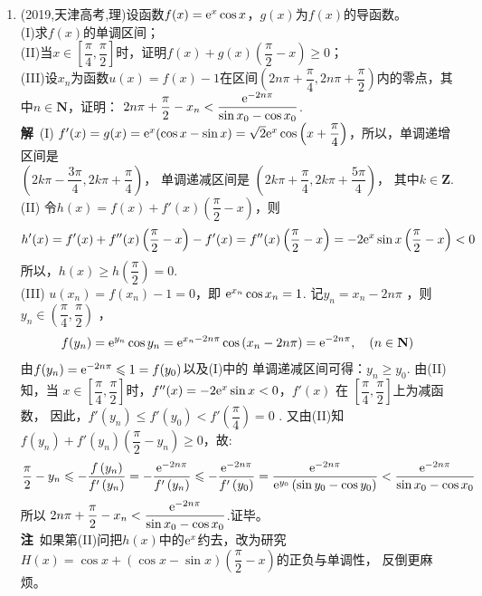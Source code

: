 \begin{enumerate}[label={【\textbf{例\thechapter.\arabic*}】},
 leftmargin=\inteval{\myenumleftmargin}pt,
 itemsep=\inteval{\myenumitempsep}pt,
 itemindent=\inteval{\myenumitemindent}pt]
\item (2019,天津高考,理)设函数$ f(x)=\mathrm{e}^x\cos x $，$ g(x) $为$ f(x) $的导函数。\\
(I)求$ f(x) $的单调区间；\\
(II)当$ x\in \left[\dfrac{\pi}{4},\dfrac{\pi}{2}\right] $时，证明$ f(x)+g(x)\left(\dfrac{\pi}{2}-x\right)\geq 0 $；\\
(III)设$ x_n $为函数$ u(x)=f(x)-1 $在区间$ \left(2n\pi+\dfrac{\pi}{4},2n\pi+
\dfrac{\pi}{2}\right) $内的零点，其中$ n\in \textbf{N} $，证明：
$ 2n\pi+\dfrac{\pi}{2}-x_n<\dfrac{\mathrm{e}^{-2n\pi}}{\sin x_0-\cos x_0} $.\\
\textbf{解}\ (I) $ f'(x)=g(x)=\mathrm{e}^x(\cos x-\sin x)=\sqrt{2}\mathrm{e}^x\cos\left(
x+\dfrac{\pi}{4}\right) $，所以，单调递增区间是 \\
$ \left(2k\pi-\dfrac{3\pi}{4},2k\pi+\dfrac{\pi}{4}\right) $，
单调递减区间是
$ \left(2k\pi+\dfrac{\pi}{4},2k\pi+\dfrac{5\pi}{4}\right) $，
其中$ k\in \textbf{Z} $. \\
(II) 令$ h(x)=f(x)+f'(x)\left(\dfrac{\pi}{2}-x\right) $，则
\begin{gather*}
    h'(x)= f'(x)+f''(x)\left(\dfrac{\pi}{2}-x\right)-f'(x)=
    f''(x)\left(\dfrac{\pi}{2}-x\right)
    =-2\mathrm{e}^x\sin x \left(\dfrac{\pi}{2}-x\right)<0
\end{gather*}
所以，$ h(x)\geq h\left(\dfrac{\pi}{2}\right)=0 $. \\
(III)  $ u(x_{n})=f(x_{n})-1=0 $，即
$ \mathrm{e}^{x_{n}}\cos x_{n}=1 $. 记$ y_{n}=x_{n}-2n\pi $ ，则
$ y_{n}\in\left(\dfrac{\pi}{4},\dfrac{\pi}{2}\right) $ ，
\begin{gather*}
    f(y_{n})=\mathrm{e}^{y_{n}}\cos y_{n}=\mathrm{e}^{x_{n}-2n\pi}
    \cos\left(x_{n}-2n\pi\right)=\mathrm{e}^{-2n\pi},\quad (n\in \textbf{N})
\end{gather*}
由$ f(y_{n})=\mathrm{e}^{-2n\pi}\leqslant 1=f(y_{0}) $以及(I)中的
单调递减区间可得：$ y_{n}\geqslant y_{0} $.
由(II)知，当 $ x\in\left[\dfrac{\pi}{4},\dfrac{\pi}{2}\right] $时，$ f''(x)=-2\mathrm{e}^x\sin x<0 $，$ f'(x) $ 在 $ \left[\dfrac{\pi}{4},\dfrac{\pi}{2}\right] $上为减函数，
因此，$ f'(y_{n})\leqslant  f'(y_{0})<f'\left(\dfrac{\pi}{4}\right)=0 $ .
又由(II)知 $ f(y_{n})+f'(y_{n})\left(\dfrac{\pi}{2}-y_{n}\right)\geqslant 0 $，故:
\begin{align*}
    \dfrac{\pi}{2}-y_{n}\leqslant-\dfrac{f\left(y_{n}\right)}{f'\left(y_{n}\right)}=-\dfrac{\mathrm{e}^{-2n\pi}}{f'\left(y_{n}\right)}\leqslant-\dfrac{\mathrm{e}^{-2n\pi}}{f'\left(y_{0}\right)}=\dfrac{\mathrm{e}^{-2n\pi}}{\mathrm{e}^{y_{0}}\left(\sin y_{0}-\cos y_{0}\right)}<\dfrac{\mathrm{e}^{-2n\pi}}{\sin x_{0}-\cos x_{0}}
\end{align*}
所以 $ 2n\pi+\dfrac{\pi}{2}-x_{n}<\dfrac{\mathrm{e}^{-2n\pi}}{\sin x_{0}-\cos x_{0}} $.证毕。 \\
\textbf{注}\ 如果第(II)问把$ h(x) $中的$ \mathrm{e}^x $约去，改为研究
$ H(x)=\cos x+(\cos x-\sin x)\left(\dfrac{\pi}{2}-x\right) $的正负与单调性，
反倒更麻烦。


\end{enumerate}
